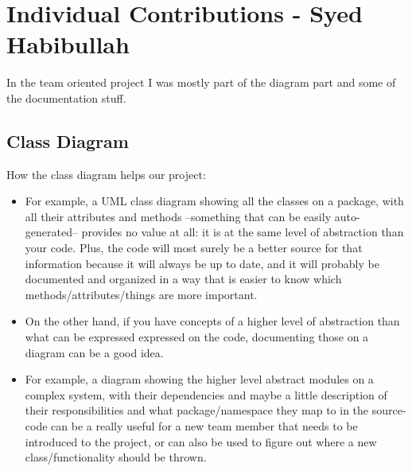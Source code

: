 \documentclass[12pt, a4paper]{article}
\begin{document}
\newpage



\section{Individual Contributions - Syed Habibullah}
In the team oriented project I was mostly part of the diagram part and  some of the documentation stuff.

\subsection{Class Diagram}
How the class diagram helps our project:
\begin{itemize}
\item For example, a UML class diagram showing all the classes on a package, with all their attributes and methods --something that can be easily auto-generated-- provides no value at all: it is at the same level of abstraction than your code. Plus, the code will most surely be a better source for that information because it will always be up to date, and it will probably be documented and organized in a way that is easier to know which methods/attributes/things are more important.
\item On the other hand, if you have concepts of a higher level of abstraction than what can be expressed expressed on the code, documenting those on a diagram can be a good idea. 
\item For example, a diagram showing the higher level abstract modules on a complex system, with their dependencies and maybe a little description of their responsibilities and what package/namespace they map to in the source-code can be a really useful for a new team member that needs to be introduced to the project, or can also be used to figure out where a new class/functionality should be thrown.
\end{itemize}
\end{document}
